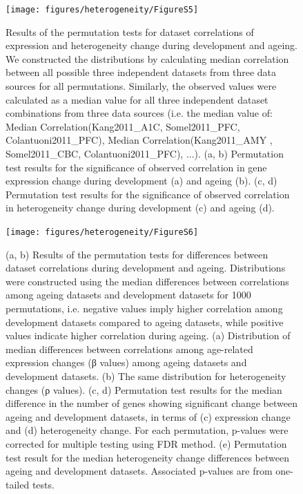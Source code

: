 \documentclass[12pt,twoside]{unicam}
\begin{document}
\begin{figure}

{\centering \texttt{[image: figures/heterogeneity/FigureS5]} 

}

\caption[Results of the permutation tests for dataset correlations of expression and heterogeneity change during development and ageing.]{Results of the permutation tests for dataset correlations of expression and heterogeneity change during development and ageing. We constructed the distributions by calculating median correlation between all possible three independent datasets from three data sources for all permutations. Similarly, the observed values were calculated as a median value for all three independent dataset combinations from three data sources (i.e. the median value of: Median Correlation(Kang2011\_A1C, Somel2011\_PFC, Colantuoni2011\_PFC), Median Correlation(Kang2011\_AMY , Somel2011\_CBC, Colantuoni2011\_PFC), ...). (a, b) Permutation test results for the significance of observed correlation in gene expression change during development (a) and ageing (b). (c, d) Permutation test results for the significance of observed correlation in heterogeneity change during development (c) and ageing (d).}\label{fig:hetFigS5}
\end{figure}

\begin{figure}

{\centering \texttt{[image: figures/heterogeneity/FigureS6]} 

}

\caption[Results of the permutation tests for differences between dataset correlations, number of significant changes, and median heterogeneity changes during development and ageing.]{(a, b) Results of the permutation tests for differences between dataset correlations during development and ageing. Distributions were constructed using the median differences between correlations among ageing datasets and development datasets for 1000 permutations, i.e. negative values imply higher correlation among development datasets compared to ageing datasets, while positive values indicate higher correlation during ageing. (a) Distribution of median differences between correlations among age-related expression changes (β values) among ageing datasets and development datasets. (b) The same distribution for heterogeneity changes (ρ values). (c, d) Permutation test results for the median difference in the number of genes showing significant change between ageing and development datasets, in terms of (c) expression change and (d) heterogeneity change. For each permutation, p-values were corrected for multiple testing using FDR method. (e) Permutation test result for the median heterogeneity change differences between ageing and development datasets. Associated p-values are from one-tailed tests.}\label{fig:hetFigS6}
\end{figure}
\end{document}
